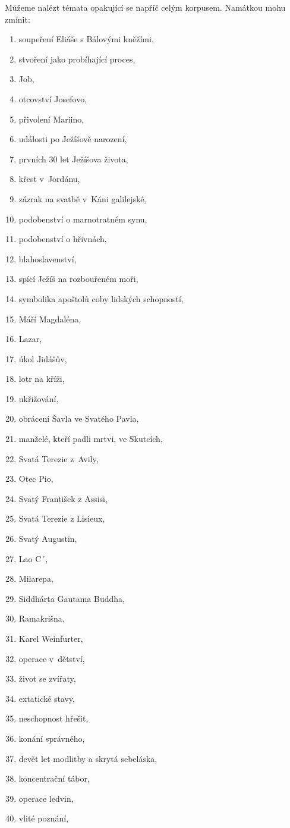 Můžeme nalézt témata opakující se napříč celým korpusem.
Namátkou mohu zmínit:

\begin{enumerate}
\item{soupeření Eliáše s Bálovými kněžími,}
\item{stvoření jako probíhající proces,}
\item{Job,}

\item{otcovství Josefovo,}
\item{přivolení Mariino,}
\item{události po Ježíšově narození,}
\item{prvních 30 let Ježíšova života,}
\item{křest v~Jordánu,}
\item{zázrak na svatbě v~Káni galilejské,}
\item{podobenství o marnotratném synu,}
\item{podobenství o hřivnách,}
\item{blahoslavenství,}
\item{spící Ježíš na rozbouřeném moři,}
\item{symbolika apoštolů coby lidských schopností,}
\item{Máří Magdaléna,}
\item{Lazar,}
\item{úkol Jidášův,}
\item{lotr na kříži,}
\item{ukřižování,}

\item{obrácení Šavla ve Svatého Pavla,}
\item{manželé, kteří padli mrtvi, ve Skutcích,}

\item{Svatá Terezie z~Avily,}
\item{Otec Pio,}
\item{Svatý František z Assisi,}
\item{Svatá Terezie z Lisieux,}
\item{Svatý Augustin,}

\item{Lao C´,}
\item{Milarepa,}
\item{Siddhárta Gautama Buddha,}
\item{Ramakrišna,}
\item{Karel Weinfurter,}

\item{operace v~dětství,}
\item{život se zvířaty,}
\item{extatické stavy,}
\item{neschopnost hřešit,}
\item{konání správného,}
\item{devět let modlitby a skrytá sebeláska,}
\item{koncentrační tábor,}
\item{operace ledvin,}
\item{vlité poznání,}


\end{enumerate}
